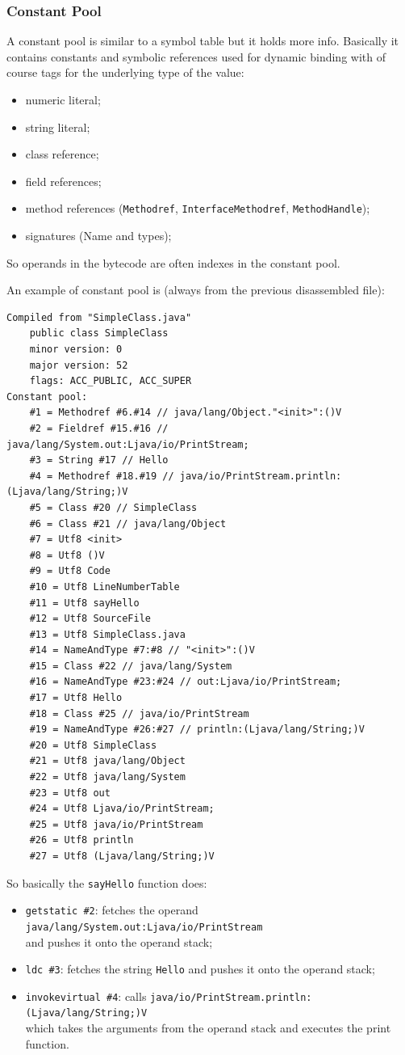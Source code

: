 \subsubsection{Constant Pool}
A constant pool is similar to a symbol table but it holds more info.
Basically it contains constants and symbolic references used for dynamic binding with of course tags for the underlying type of the value:
\begin{itemize}
    \item numeric literal;
    \item string literal;
    \item class reference;
    \item field references;
    \item method references (\verb|Methodref|, \verb|InterfaceMethodref|, \verb|MethodHandle|);
    \item signatures (Name and types);
\end{itemize}
So operands in the bytecode are often indexes in the constant pool.

An example of constant pool is (always from the previous disassembled file):
\begin{verbatim}
Compiled from "SimpleClass.java"
    public class SimpleClass
    minor version: 0
    major version: 52
    flags: ACC_PUBLIC, ACC_SUPER
Constant pool:
    #1 = Methodref #6.#14 // java/lang/Object."<init>":()V
    #2 = Fieldref #15.#16 // java/lang/System.out:Ljava/io/PrintStream;
    #3 = String #17 // Hello
    #4 = Methodref #18.#19 // java/io/PrintStream.println:(Ljava/lang/String;)V
    #5 = Class #20 // SimpleClass
    #6 = Class #21 // java/lang/Object
    #7 = Utf8 <init>
    #8 = Utf8 ()V
    #9 = Utf8 Code
    #10 = Utf8 LineNumberTable
    #11 = Utf8 sayHello
    #12 = Utf8 SourceFile
    #13 = Utf8 SimpleClass.java
    #14 = NameAndType #7:#8 // "<init>":()V
    #15 = Class #22 // java/lang/System
    #16 = NameAndType #23:#24 // out:Ljava/io/PrintStream;
    #17 = Utf8 Hello
    #18 = Class #25 // java/io/PrintStream
    #19 = NameAndType #26:#27 // println:(Ljava/lang/String;)V
    #20 = Utf8 SimpleClass
    #21 = Utf8 java/lang/Object
    #22 = Utf8 java/lang/System
    #23 = Utf8 out
    #24 = Utf8 Ljava/io/PrintStream;
    #25 = Utf8 java/io/PrintStream
    #26 = Utf8 println
    #27 = Utf8 (Ljava/lang/String;)V
\end{verbatim}

So basically the \verb|sayHello| function does:
\begin{itemize}
    \item \verb|getstatic #2|: fetches the operand \verb|java/lang/System.out:Ljava/io/PrintStream| \\
    and pushes it onto the operand stack;
    \item \verb|ldc #3|: fetches the string \verb|Hello| and pushes it onto the operand stack;
    \item \verb|invokevirtual #4|: calls \verb|java/io/PrintStream.println:(Ljava/lang/String;)V| \\
    which takes the arguments from the operand stack and executes the print function.
\end{itemize}

